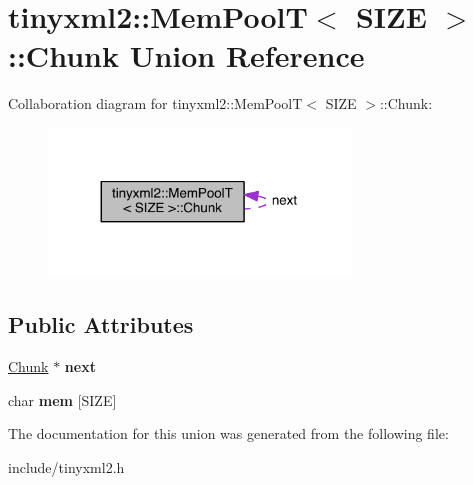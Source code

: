 \hypertarget{uniontinyxml2_1_1_mem_pool_t_1_1_chunk}{}\section{tinyxml2\+:\+:Mem\+Pool\+T$<$ S\+I\+Z\+E $>$\+:\+:Chunk Union Reference}
\label{uniontinyxml2_1_1_mem_pool_t_1_1_chunk}


Collaboration diagram for tinyxml2\+:\+:Mem\+Pool\+T$<$ S\+I\+Z\+E $>$\+:\+:Chunk\+:\nopagebreak
\begin{figure}[H]
\begin{center}
\leavevmode
\includegraphics[width=227pt]{uniontinyxml2_1_1_mem_pool_t_1_1_chunk__coll__graph}
\end{center}
\end{figure}
\subsection*{Public Attributes}
\begin{DoxyCompactItemize}
\item 
\hypertarget{uniontinyxml2_1_1_mem_pool_t_1_1_chunk_ae97e0810e7bf7a28264f3e1f112d52b4}{}\hyperlink{uniontinyxml2_1_1_mem_pool_t_1_1_chunk}{Chunk} $\ast$ {\bfseries next}\label{uniontinyxml2_1_1_mem_pool_t_1_1_chunk_ae97e0810e7bf7a28264f3e1f112d52b4}

\item 
\hypertarget{uniontinyxml2_1_1_mem_pool_t_1_1_chunk_a977aaaca9a6b080faada2ac779388ee6}{}char {\bfseries mem} \mbox{[}S\+I\+Z\+E\mbox{]}\label{uniontinyxml2_1_1_mem_pool_t_1_1_chunk_a977aaaca9a6b080faada2ac779388ee6}

\end{DoxyCompactItemize}


The documentation for this union was generated from the following file\+:\begin{DoxyCompactItemize}
\item 
include/tinyxml2.\+h\end{DoxyCompactItemize}
